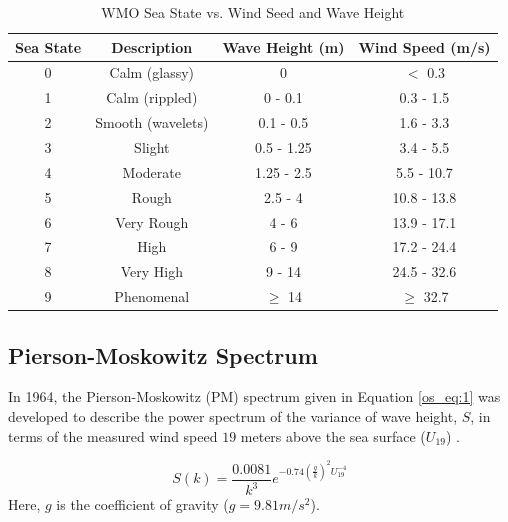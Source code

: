 \begin{table}[ht]
  \begin{center}
      \renewcommand{\baselinestretch}{1} \small\normalsize
  \begin{quote}
    \caption[WMO Sea State vs. Wind Speed and Wave Height]{WMO Sea State vs. Wind Seed and Wave Height\label{os_tab:0}}
  \end{quote}
  \begin{tabular} {|c | c | c| c|}
    \hline
  \bf{Sea State} & \bf{Descriptio}n & \bf{Wave Height (m)} & \bf{Wind Speed (m/s)}\\ \hline
  0 & Calm (glassy) & 0 & $<$ 0.3 \\ \hline
  1 & Calm (rippled) & 0 - 0.1 & 0.3 - 1.5 \\ \hline
  2 & Smooth (wavelets) & 0.1 - 0.5 & 1.6 - 3.3 \\ \hline
  3 & Slight & 0.5 - 1.25 & 3.4 - 5.5 \\ \hline
  4 & Moderate & 1.25 - 2.5 & 5.5 - 10.7 \\ \hline
  5 & Rough & 2.5 - 4 & 10.8 - 13.8 \\ \hline
  6 & Very Rough & 4 - 6 & 13.9 - 17.1\\ \hline
  7 & High & 6 - 9 & 17.2 - 24.4\\ \hline
  8 & Very High & 9 - 14 & 24.5 - 32.6\\ \hline
  9 & Phenomenal & $\geq$ 14 & $\geq$ 32.7\\ \hline
\end{tabular}
\end{center}
\end{table}
\renewcommand{\baselinestretch}{2} \small\normalsize

\subsection {Pierson-Moskowitz Spectrum}
In 1964, the Pierson-Moskowitz (PM) spectrum given in Equation \ref{os_eq:1} was developed to describe the power spectrum of the variance of wave height, $S$, in terms of the measured wind speed $19$ meters above the sea surface ($U_{19}$) \cite{michel_sea_spectra}.
 
 \begin{equation}
S(k) = \frac{0.0081}{k^3}e^{-0.74\left(\frac{g}{k}\right)^2U_{19}^{-4}}
\label{os_eq:1}
\end{equation}
 \renewcommand{\baselinestretch}{2} \small\normalsize
Here, $g$ is the coefficient of gravity ($g = 9.81 m/s^2$). 
 
